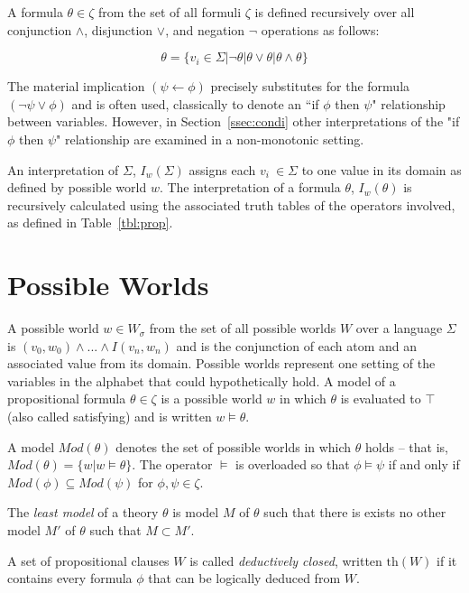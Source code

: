 A formula $\theta \in \zeta$ from the set of all formuli $\zeta$ is defined recursively over all conjunction $\land$, disjunction $\lor$, and negation $\lnot$ operations as follows:

\[
\theta = \{ v_i \in \Sigma | \lnot \theta | \theta \lor \theta | \theta \land \theta \}
\]


The material implication $(\psi \leftarrow \phi)$ precisely substitutes for the formula $(\lnot \psi \lor \phi)$ and is often used, classically to denote an ``if $\phi$ then $\psi$" relationship between variables. However, in Section~\ref{ssec:condi} other interpretations of the "if $\phi$ then $\psi$" relationship are examined in a non-monotonic setting.

An interpretation of $\Sigma$, $I_w(\Sigma)$ assigns each $v_i\ \in \Sigma$ to one value in its domain as defined by possible world $w$. The interpretation of a formula $\theta$, $I_w(\theta)$ is recursively calculated using the associated truth tables of the operators involved, as defined in Table~\ref{tbl:prop}. 

\section{Possible Worlds}\label{ssec:poss}
A possible world $w\in W_\sigma$ from the set of all possible worlds $W$ over a language $\Sigma$ is $(v_0,w_0) \land ... \land I(v_n,w_n)$ and is the conjunction of each atom and an associated value from its domain. Possible worlds represent one setting of the variables in the alphabet that could hypothetically hold. A model of a propositional formula $\theta \in \zeta$ is a possible world $w$ in which $\theta$ is evaluated to $\top$ (also called satisfying) and is written $w \models \theta$. 

A model $Mod(\theta)$ denotes the set of possible worlds in which $\theta$ holds -- that is, $Mod(\theta)=\{w|w\models \theta\}$. The operator $\models$ is overloaded so that $\phi \models \psi$ if and only if $Mod(\phi) \subseteq Mod(\psi)$ for $\phi,\psi \in \zeta$.

The \textit{least model} of a theory $\theta$ is model $M$ of $\theta$ such that there is  exists no other model $M'$ of $\theta$ such that $M \subset M'$.

A set of propositional clauses $W$ is called \textit{deductively closed}, written $\text{th}(W)$ if it contains every formula $\phi$ that can be logically deduced from $W$. 


